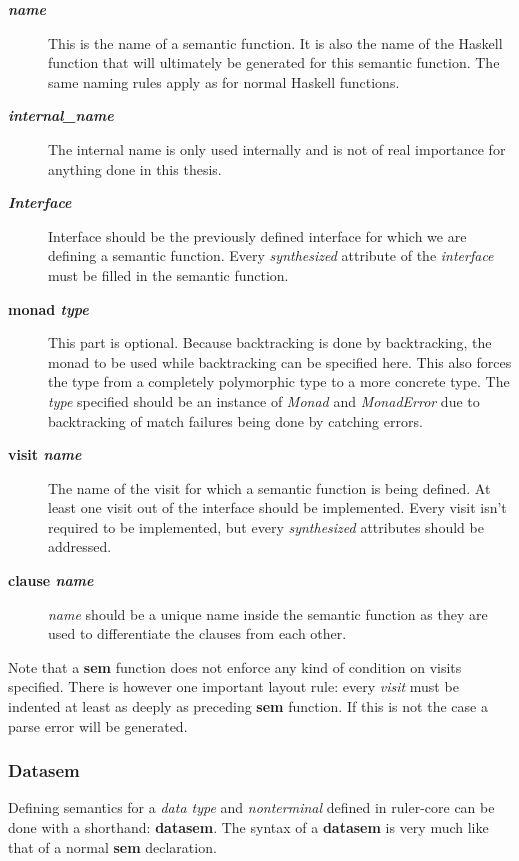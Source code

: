 \begin{description}
\item[\textbf{\textit{name}}] This is the name of a semantic function. It is also the name of the Haskell function that will ultimately be generated for this semantic function. The same naming rules apply as for normal Haskell functions.
\item[\textbf{\textit{internal\_name}}] The internal name is only used internally and is not of real importance for anything done in this thesis.
\item[\textbf{\textit{Interface}}] Interface should be the previously defined interface for which we are defining a semantic function. Every \emph{synthesized} attribute of the \emph{interface} must be filled in the semantic function.
\item[\textbf{monad \textit{type}}] { This part is optional. Because backtracking is done by backtracking, the monad to be used while backtracking can be specified here. This also forces the type from a completely polymorphic type to a more concrete type. The \textit{type} specified should be an instance of \emph{Monad} and \emph{MonadError} due to backtracking of match failures being done by catching errors.}
\item[\textbf{visit \textit{name}}] The name of the visit for which a semantic function is being defined. At least one visit out of the interface should be implemented. Every visit isn't required to be implemented, but every \emph{synthesized} attributes should be addressed.
\item[\textbf{clause \textit{name}}] \textit{name} should be a unique name inside the semantic function as they are used to differentiate the clauses from each other.
\end{description}

Note that a \textbf{sem} function does not enforce any kind of condition on visits specified. There is however one important layout rule: every \emph{visit} must be indented at least as deeply as preceding \textbf{sem} function. If this is not the case a parse error will be generated.
\subsubsection{Datasem}
Defining semantics for a \emph{data type} and \emph{nonterminal} defined in ruler-core can be done with a shorthand: \textbf{datasem}. The syntax of a \textbf{datasem} is very much like that of a normal \textbf{sem} declaration.

